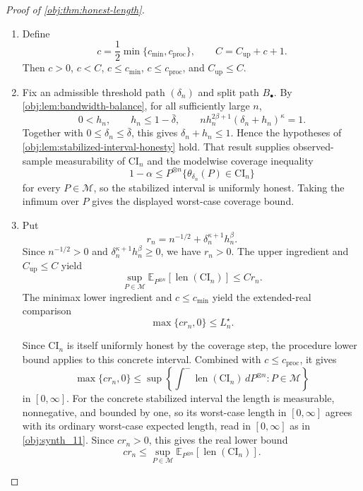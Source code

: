 \begin{proof}[Proof of \cref{obj:thm:honest-length}]
\begin{enumerate}
The every-procedure version uses that a uniformly honest procedure is an admissible competitor in the
minimax honest-length criterion. Hence there is a positive constant \(c_{\mathrm{proc}}>0\) such that
every uniformly honest observed-sample interval procedure \(C_n\) satisfies
\[
\max\!\left\{c_{\mathrm{proc}}\left(n^{-1/2}+\delta_n^{\kappa+1}h_n^\beta\right),0\right\}
\le
\sup\left\{
\int^{-}\operatorname{len}(C_n)\,dP^{\otimes n}: P\in\mathcal M
\right\}
\]
in \(\mathbb R_{\ge0}\cup\{\infty\}\).

\item Define
\[
c=\frac12\min\{c_{\mathrm{min}},c_{\mathrm{proc}}\},
\qquad
C=C_{\mathrm{up}}+c+1 .
\]
Then \(c>0\), \(c<C\), \(c\le c_{\mathrm{min}}\), \(c\le c_{\mathrm{proc}}\), and \(C_{\mathrm{up}}\le C\).

\item Fix an admissible threshold path \((\delta_n)\) and split path \(B_\bullet\). By
\cref{obj:lem:bandwidth-balance}, for all sufficiently large \(n\),
\[
0<h_n,
\qquad
h_n\le 1-\bar\delta,
\qquad
n h_n^{2\beta+1}(\delta_n+h_n)^\kappa=1 .
\]
Together with \(0\le\delta_n\le\bar\delta\), this gives \(\delta_n+h_n\le1\). Hence the hypotheses of
\cref{obj:lem:stabilized-interval-honesty} hold. That result supplies observed-sample measurability of
\(\mathrm{CI}_n\) and the modelwise coverage inequality
\[
1-\alpha
\le
P^{\otimes n}\{\theta_{\delta_n}(P)\in \mathrm{CI}_n\}
\]
for every \(P\in\mathcal M\), so the stabilized interval is uniformly honest.
Taking the infimum over \(P\) gives the displayed worst-case coverage bound.

\item Put
\[
r_n=n^{-1/2}+\delta_n^{\kappa+1}h_n^\beta .
\]
Since \(n^{-1/2}>0\) and \(\delta_n^{\kappa+1}h_n^\beta\ge0\), we have \(r_n>0\). The upper ingredient and \(C_{\mathrm{up}}\le C\)
yield
\[
\sup_{P\in\mathcal M}
\mathbb E_{P^{\otimes n}}\!\left[\operatorname{len}(\mathrm{CI}_n)\right]
\le C r_n .
\]
The minimax lower ingredient and \(c\le c_{\mathrm{min}}\) yield the extended-real comparison
\[
\max\{c r_n,0\}\le L_n^\star .
\]

Since \(\mathrm{CI}_n\) is itself uniformly honest by the coverage step, the procedure lower bound
applies to this concrete interval. Combined with \(c\le c_{\mathrm{proc}}\), it gives
\[
\max\{c r_n,0\}
\le
\sup\left\{
\int^{-}\operatorname{len}(\mathrm{CI}_n)\,dP^{\otimes n}: P\in\mathcal M
\right\}
\]
in \([0,\infty]\). For the concrete stabilized interval the length is measurable, nonnegative, and
bounded by one, so its worst-case length in \([0,\infty]\) agrees with its ordinary worst-case
expected length, read in \([0,\infty]\) as in \cref{obj:synth_11}. Since \(c r_n>0\), this gives the
real lower bound
\[
c r_n
\le
\sup_{P\in\mathcal M}
\mathbb E_{P^{\otimes n}}\!\left[\operatorname{len}(\mathrm{CI}_n)\right].
\]


\end{enumerate}
\end{proof}
